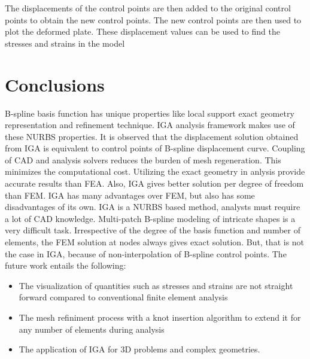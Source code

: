 \documentclass[submit,12pt]{aiaa-pretty} %
\begin{document}
The displacements of the control points are then added to the original control points to obtain the new control points. The new control points are then used to plot the deformed plate. These displacement values can be used to find the stresses and strains in the model

\section{Conclusions}
B-spline basis function has unique properties like local support exact
geometry representation and refinement technique. IGA analysis
framework makes use of these NURBS properties. It is observed that the
displacement solution obtained from IGA is equivalent to control
points of B-spline displacement curve. Coupling of CAD and analysis
solvers reduces the burden of mesh regeneration. This minimizes the
computational cost. Utilizing the exact geometry in anlysis provide
accurate results than FEA. Also, IGA gives better solution per degree
of freedom than FEM.  IGA has many advantages over FEM, but also has
some disadvantages of its own. IGA is a NURBS based method, analysts
must require a lot of CAD knowledge. Multi-patch B-spline modeling of
intricate shapes is a very difficult task. Irrespective of the degree
of the basis function and number of elements, the FEM solution at
nodes always gives exact solution. But, that is not the case in IGA,
because of non-interpolation of B-spline control points.
The future work entails the following:
\begin{itemize}
    \item The visualization of quantities such as stresses and strains
      are not straight forward compared to conventional finite element
      analysis
    \item The mesh refiniment process with a knot insertion algorithm
      to extend it for any number of elements during analysis
    \item The application of IGA for 3D problems and complex geometries.
\end{itemize}



\end{document}

